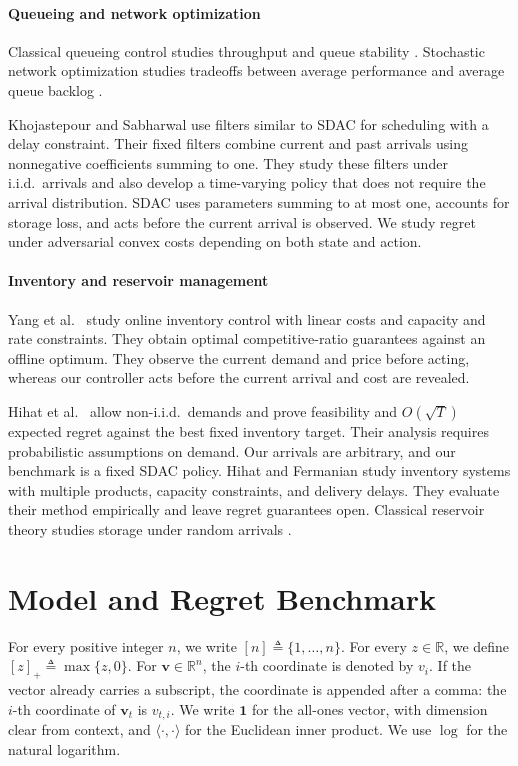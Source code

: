 \documentclass[journal]{IEEEtran}
\theoremstyle{remark}
\begin{document}
\paragraph{Queueing and network optimization}
Classical queueing control studies throughput and queue stability
\cite{tassiulas1992stability,tassiulas1993dynamic,mckeown1999achieving}.
Stochastic network optimization studies tradeoffs between average performance
and average queue backlog \cite{neely2010stochastic}.

Khojastepour and Sabharwal \cite{khojastepour2004delay} use filters similar
to SDAC for scheduling with a delay constraint. Their fixed filters combine
current and past arrivals using nonnegative coefficients summing to one.
They study these filters under i.i.d.\ arrivals and also develop a
time-varying policy that does not require the arrival distribution.
SDAC uses parameters summing to at most one, accounts for storage loss,
and acts before the current arrival is observed. We study regret under
adversarial convex costs depending on both state and action.

\paragraph{Inventory and reservoir management}
Yang et al.\ \cite{yang2020online} study online inventory control with
linear costs and capacity and rate constraints. They obtain optimal
competitive-ratio guarantees against an offline optimum. They observe the current
demand and price before acting, whereas our controller acts before the
current arrival and cost are revealed.

Hihat et al.\ \cite{hihat2023inventory} allow non-i.i.d.\ demands and prove
feasibility and $O(\sqrt{T})$ expected regret against the best fixed
inventory target. Their analysis requires probabilistic assumptions on
demand. Our arrivals are arbitrary, and our benchmark is a fixed SDAC policy.
Hihat and Fermanian \cite{hihat2024online} study inventory systems with
multiple products, capacity constraints, and delivery delays. They evaluate
their method empirically and leave regret guarantees open. Classical
reservoir theory studies storage under random arrivals \cite{moran1954dams}.


\section{Model and Regret Benchmark}
\label{sec:model-setup}

For every positive integer $n$, we write
$[n]\triangleq\{1,\ldots,n\}$. For every $z\in\mathbb{R}$, we define
$[z]_+\triangleq\max\{z,0\}$. For
$\mathbf{v}\in\mathbb{R}^n$, the $i$-th coordinate is denoted by $v_i$. If the
vector already carries a subscript, the coordinate is appended after a comma: the
$i$-th coordinate of $\mathbf{v}_t$ is $v_{t,i}$. We write
$\mathbf{1}$ for the all-ones vector, with dimension clear from context, and
$\langle\cdot,\cdot\rangle$ for the Euclidean inner product. We use $\log$ for the
natural logarithm.
\end{document}
